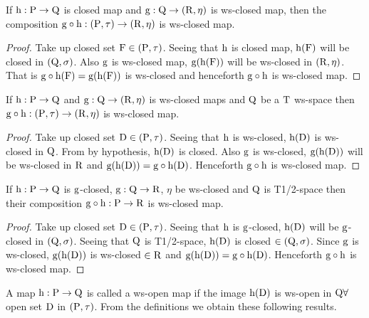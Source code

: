 \begin{thm}\label{thm4.2.34}
If $\mathrm{h}: \mathrm{P} \to \mathrm{Q}$ is closed map and $\mathrm{g}: \mathrm{Q}\to (\mathrm{R}, \eta)$ is ws-closed map, then the composition $\mathrm{g} \circ \mathrm{h}: (\mathrm{P}, \tau) \to (\mathrm{R}, \eta)$ is ws-closed map.
\end{thm}

\begin{proof}
Take up closed set $\mathrm{F} \in(\mathrm{P}, \tau)$. Seeing that $\mathrm{h}$ is closed map, $\mathrm{h} (\mathrm{F})$ will be closed in $(\mathrm{Q}, \sigma)$. Also $\mathrm{g}$ is ws-closed map, $\mathrm{g} (\mathrm{h}(\mathrm{F}))$ will be ws-closed in $(\mathrm{R}, \eta)$. That is $\mathrm{g} \circ \mathrm{h} (\mathrm{F}) = \mathrm{g} (\mathrm{h} (\mathrm{F}))$ is ws-closed and henceforth $\mathrm{g} \circ \mathrm{h}$ is ws-closed map.
\end{proof}

\begin{thm}\label{thm4.2.35}
If $\mathrm{h}: \mathrm{P} \to \mathrm{Q}$ and $\mathrm{g}: \mathrm{Q}\to (\mathrm{R}, \eta)$ is ws-closed maps and $\mathrm{Q}$ be a $\mathrm{T}$ ws-space then $\mathrm{g} \circ \mathrm{h}: (\mathrm{P}, \tau) \to (\mathrm{R}, \eta)$ is ws-closed map.
\end{thm}

\begin{proof}
Take up closed set $\mathrm{D} \in (\mathrm{P}, \tau)$. Seeing that $\mathrm{h}$ is ws-closed, $\mathrm{h} (\mathrm{D})$ is ws-closed in $\mathrm{Q}$. From by hypothesis, $\mathrm{h} (\mathrm{D})$ is closed. Also $\mathrm{g}$ is ws-closed, $\mathrm{g} (\mathrm{h} (\mathrm{D}))$ will be ws-closed in $\mathrm{R}$ and $\mathrm{g}(\mathrm{h}(\mathrm{D})) = \mathrm{g} \circ \mathrm{h}(\mathrm{D})$. Henceforth $\mathrm{g} \circ \mathrm{h}$ is ws-closed map.
\end{proof}

\begin{thm}\label{thm4.2.36}
If $\mathrm{h}: \mathrm{P} \to \mathrm{Q}$ is $\mathrm{g}$-closed, $\mathrm{g}: \mathrm{Q} \to \mathrm{R}$, $\eta$ be ws-closed and $\mathrm{Q}$ is T1/2-space then their composition $\mathrm{g} \circ \mathrm{h}: \mathrm{P} \to \mathrm{R}$ is ws-closed map.
\end{thm}

\begin{proof}
Take up closed set $\mathrm{D} \in (\mathrm{P}, \tau)$. Seeing that $\mathrm{h}$ is $\mathrm{g}$-closed, $\mathrm{h} (\mathrm{D})$ will be $\mathrm{g}$-closed in $(\mathrm{Q}, \sigma)$. Seeing that $\mathrm{Q}$ is T1/2-space, $\mathrm{h}(\mathrm{D})$ is closed $\in (\mathrm{Q}, \sigma)$. Since $\mathrm{g}$ is ws-closed, $\mathrm{g} (\mathrm{h}(\mathrm{D}))$ is ws-closed $\in \mathrm{R}$ and $\mathrm{g}(\mathrm{h}(\mathrm{D})) = \mathrm{g} \circ \mathrm{h}(\mathrm{D})$. Henceforth $\mathrm{g} \circ \mathrm{h}$ is ws-closed map.
\end{proof}

\begin{dfn}\label{defi4.2.37}
A map $\mathrm{h}: \mathrm{P} \to \mathrm{Q}$ is called a ws-open map if the image $\mathrm{h} (\mathrm{D})$ is ws-open in $\mathrm{Q}\forall$ open set $\mathrm{D}$ in $(\mathrm{P}, \tau)$. From the definitions we obtain these following results.
\end{dfn}

